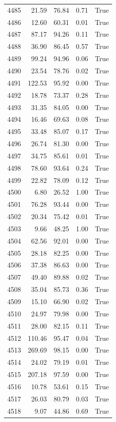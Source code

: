 \begin{longtable}{rrrrr}
4485 & 21.59 & 76.84 & 0.71 & True \\
4486 & 12.60 & 60.31 & 0.01 & True \\
4487 & 87.17 & 94.26 & 0.11 & True \\
4488 & 36.90 & 86.45 & 0.57 & True \\
4489 & 99.24 & 94.96 & 0.06 & True \\
4490 & 23.54 & 78.76 & 0.02 & True \\
4491 & 122.53 & 95.92 & 0.00 & True \\
4492 & 18.78 & 73.37 & 0.28 & True \\
4493 & 31.35 & 84.05 & 0.00 & True \\
4494 & 16.46 & 69.63 & 0.08 & True \\
4495 & 33.48 & 85.07 & 0.17 & True \\
4496 & 26.74 & 81.30 & 0.00 & True \\
4497 & 34.75 & 85.61 & 0.01 & True \\
4498 & 78.60 & 93.64 & 0.24 & True \\
4499 & 22.82 & 78.09 & 0.12 & True \\
4500 & 6.80 & 26.52 & 1.00 & True \\
4501 & 76.28 & 93.44 & 0.00 & True \\
4502 & 20.34 & 75.42 & 0.01 & True \\
4503 & 9.66 & 48.25 & 1.00 & True \\
4504 & 62.56 & 92.01 & 0.00 & True \\
4505 & 28.18 & 82.25 & 0.00 & True \\
4506 & 37.38 & 86.63 & 0.00 & True \\
4507 & 49.40 & 89.88 & 0.02 & True \\
4508 & 35.04 & 85.73 & 0.36 & True \\
4509 & 15.10 & 66.90 & 0.02 & True \\
4510 & 24.97 & 79.98 & 0.00 & True \\
4511 & 28.00 & 82.15 & 0.11 & True \\
4512 & 110.46 & 95.47 & 0.04 & True \\
4513 & 269.69 & 98.15 & 0.00 & True \\
4514 & 24.02 & 79.19 & 0.01 & True \\
4515 & 207.18 & 97.59 & 0.00 & True \\
4516 & 10.78 & 53.61 & 0.15 & True \\
4517 & 26.03 & 80.79 & 0.03 & True \\
4518 & 9.07 & 44.86 & 0.69 & True \\

\end{longtable}
